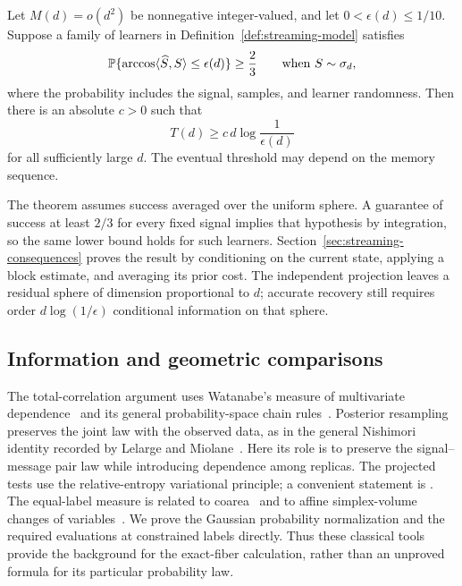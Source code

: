 \begin{theorem}\label{thm:streaming}
Let $M(d)=o(d^2)$ be nonnegative integer-valued, and let
$0<\epsilon(d)\le1/10$. Suppose a family of learners in
Definition~\ref{def:streaming-model} satisfies
\[
 \mathbb P\{\arccos\langle\widehat S,S\rangle\le\epsilon(d)\}\ge\frac23
 \qquad\text{when }S\sim\sigma_d,
\]
where the probability includes the signal, samples, and learner randomness.
Then there is an absolute $c>0$ such that
\[
 T(d)\ge c\,d\log\frac1{\epsilon(d)}
\]
for all sufficiently large $d$. The eventual threshold may depend on the
memory sequence.
\end{theorem}

The theorem assumes success averaged over the uniform sphere. A guarantee
of success at least $2/3$ for every fixed signal implies that hypothesis
by integration, so the same lower bound holds for such learners.
Section~\ref{sec:streaming-consequences} proves the result by conditioning
on the current state, applying a block estimate, and averaging its prior
cost. The independent projection leaves a residual sphere of dimension
proportional to $d$; accurate recovery still requires order
$d\log(1/\epsilon)$ conditional information on that sphere.

\subsection*{Information and geometric comparisons}

The total-correlation argument uses Watanabe's measure of multivariate
dependence~\cite{Watanabe1960} and its general probability-space chain
rules~\cite[Sections~3.3 and~6]{Austin2020}. Posterior resampling preserves
the joint law with the observed data, as in the general Nishimori identity
recorded by Lelarge and Miolane~\cite[Proposition~16]{LelargeMiolane2019}.
Here its role is to preserve the signal--message pair law while introducing
dependence among replicas. The projected tests use the
relative-entropy variational principle; a convenient statement is
\cite[Equations~(1.1)--(1.2)]{DupuisMao2022}. The equal-label measure is
related to coarea~\cite[Theorem~3.1]{Federer1959} and to affine
simplex-volume changes of variables~\cite[Lemma~1]{Drury1984}.
We prove the Gaussian probability normalization and the required
evaluations at constrained labels directly. Thus these classical tools
provide the background for the exact-fiber calculation, rather than an
unproved formula for its particular probability law.

